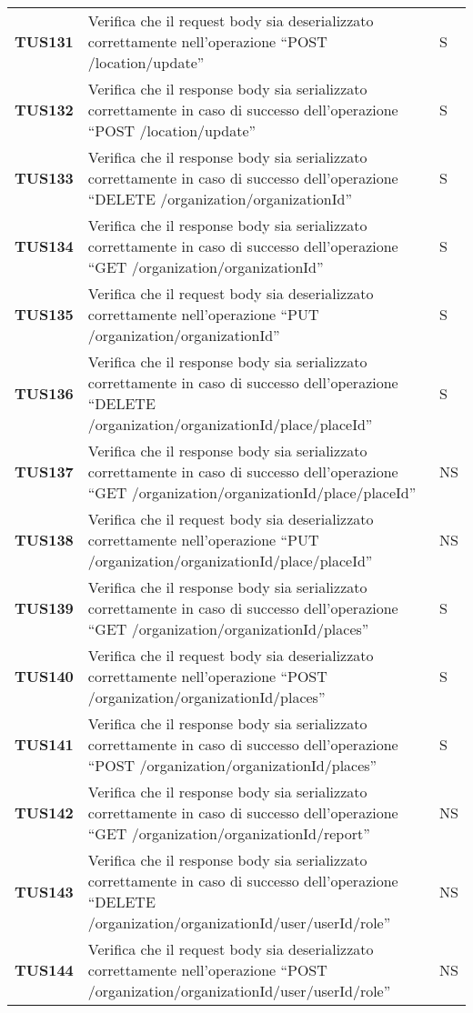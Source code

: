 \documentclass[../../piano-di-qualifica.tex]{subfiles}
\begin{document}
\begin{longtable}[H]{>{\centering\bfseries}m{3cm} >{}m{10cm} >{\centering\arraybackslash}m{3cm}}

  TUS131 & Verifica che il request body sia deserializzato correttamente nell'operazione ``POST /location/update'' & S \\
  TUS132 & Verifica che il response body sia serializzato correttamente in caso di successo dell'operazione ``POST /location/update'' & S \\
  TUS133 & Verifica che il response body sia serializzato correttamente in caso di successo dell'operazione ``DELETE /organization/{organizationId}'' & S \\
  TUS134 & Verifica che il response body sia serializzato correttamente in caso di successo dell'operazione ``GET /organization/{organizationId}'' & S \\
  TUS135 & Verifica che il request body sia deserializzato correttamente nell'operazione ``PUT /organization/{organizationId}'' & S \\
  TUS136 & Verifica che il response body sia serializzato correttamente in caso di successo dell'operazione ``DELETE /organization/{organizationId}/place/{placeId}'' & S \\
  TUS137 & Verifica che il response body sia serializzato correttamente in caso di successo dell'operazione ``GET /organization/{organizationId}/place/{placeId}'' & NS \\
  TUS138 & Verifica che il request body sia deserializzato correttamente nell'operazione ``PUT /organization/{organizationId}/place/{placeId}'' & NS \\
  TUS139 & Verifica che il response body sia serializzato correttamente in caso di successo dell'operazione ``GET /organization/{organizationId}/places'' & S \\
  TUS140 & Verifica che il request body sia deserializzato correttamente nell'operazione ``POST /organization/{organizationId}/places'' & S \\
  TUS141 & Verifica che il response body sia serializzato correttamente in caso di successo dell'operazione ``POST /organization/{organizationId}/places'' & S \\
  TUS142 & Verifica che il response body sia serializzato correttamente in caso di successo dell'operazione ``GET /organization/{organizationId}/report'' & NS \\
  TUS143 & Verifica che il response body sia serializzato correttamente in caso di successo dell'operazione ``DELETE /organization/{organizationId}/user/{userId}/role'' & NS \\
  TUS144 & Verifica che il request body sia deserializzato correttamente nell'operazione ``POST /organization/{organizationId}/user/{userId}/role'' & NS \\

\end{longtable}
\end{document}
